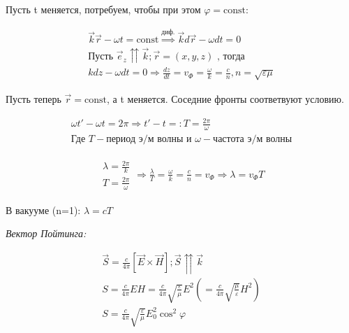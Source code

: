 Пусть t меняется, потребуем, чтобы при этом \( \varphi=\mathrm{const} \):

\begin{gather*}
    \vec{k}\vec{r}-\omega t =\mathrm{const} \overset{\text{диф.}}{\Rightarrow} \vec{k}d\vec{r}-\omega dt =0 \\
    \text{Пусть } \vec{e}_z \upuparrows \vec{k} ; \vec{r}=(x,y,z) \text{ , тогда } \\
    kdz -\omega dt=0 \Rightarrow \frac{dz}{dt}=\boxed{v_{\Phi}=\frac{\omega}{k}=\frac{c}{n}, n=\sqrt{\varepsilon\mu}}  
\end{gather*}

Пусть теперь \( \vec{r}=\mathrm{const}  \), а t меняется. Соседние  фронты соответвуют условию.

\begin{gather*}
    \omega t'-\omega t=2\pi \Rightarrow \boxed{t'-t=:T=\frac{2\pi}{\omega}} \\
    \text{Где } T-\text{период э/м волны и } \omega-\text{частота э/м волны}
\end{gather*}

\[
\begin{aligned}
    \begin{array}{l|l}
        \lambda=\frac{2\pi}{k} \\
        T=\frac{2\pi}{\omega}  
    \end{array}
    \Rightarrow
    \frac{\lambda}{T}=\frac{\omega}{k}=\frac{c}{n}=v_{\Phi}\Rightarrow \lambda=v_{\Phi}T     
\end{aligned}
\] 

В вакууме (n=1): \(\lambda=cT  \) 

\textit{Вектор Пойтинга:}

\begin{gather*}
    \vec{S}=\frac{c}{4\pi}[\vec{E}\times \vec{H}] ; \vec{S}\upuparrows \vec{k }\\
    S=\frac{c}{4\pi}EH=\frac{c}{4\pi}\sqrt{\frac{\varepsilon}{\mu} }E^2 \left( =\frac{c}{4\pi} \sqrt{\frac{\mu}{\varepsilon}}H^2 \right)  \\
    S=\frac{c}{4\pi}\sqrt{\frac{\varepsilon}{\mu} }E^2_0\cos^2\varphi 
\end{gather*}


